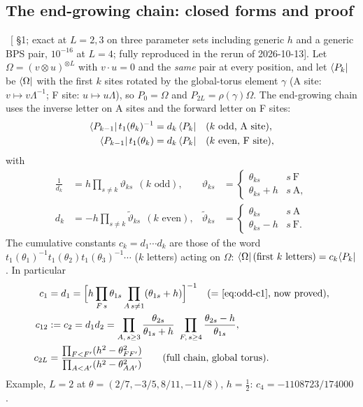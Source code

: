 \subsection{The end-growing chain: closed forms and proof}\label{sec:odd-chain}

\ex\ [ \S1; exact at $L=2,3$ on three parameter sets including generic $h$ and a generic BPS pair,
$10^{-16}$ at $L=4$; fully reproduced in the rerun of 2026-10-13]. Let $\Omega=(v\otimes u)^{\otimes L}$ with $v\cdot u=0$ and the
\emph{same} pair at every position, and let $\langle P_k|$ be $\langle\Omega|$ with the first $k$ sites rotated by the global-torus element
$\gamma$ (A site: $v\mapsto v\Lambda^{-1}$; F site: $u\mapsto u\Lambda$), so $P_0=\Omega$ and $P_{2L}=\rho(\gamma)\Omega$. The
end-growing chain uses the inverse letter on A sites and the forward letter on F sites:
\begin{align}
 \langle P_{k-1}|\,t_1(\theta_k)^{-1}&=d_k\,\langle P_k|&&(k\text{ odd, A site}),\label{eq:odd-dA}\\
 \langle P_{k-1}|\,t_1(\theta_k)&=d_k\,\langle P_k|&&(k\text{ even, F site}),\label{eq:odd-dF}
\end{align}
with
\begin{align}\label{eq:odd-d}
 \frac1{d_k}&=h\prod_{s\ne k}\vartheta_{ks}\ \ (k\text{ odd}),&
 \vartheta_{ks}&=\begin{cases}\theta_{ks}&s\ \mathrm F\\ \theta_{ks}+h&s\ \mathrm A,\end{cases}\\
 d_k&=-h\prod_{s\ne k}\tilde\vartheta_{ks}\ \ (k\text{ even}),&
 \tilde\vartheta_{ks}&=\begin{cases}\theta_{ks}&s\ \mathrm A\\ \theta_{ks}-h&s\ \mathrm F.\end{cases}
\end{align}
The cumulative constants $c_k=d_1\cdots d_k$ are those of the word $t_1(\theta_1)^{-1}t_1(\theta_2)t_1(\theta_3)^{-1}\cdots$
($k$ letters) acting on $\Omega$: $\langle\Omega|\,(\text{first }k\text{ letters})=c_k\langle P_k|$. In particular
\begin{align}
 c_1&=d_1=\Big[h\prod_{F\,s}\theta_{1s}\prod_{A\,s\ne1}(\theta_{1s}+h)\Big]^{-1}\quad\text{(= \eqref{eq:odd-c1}, now proved)},\\
 c_{12}&:=c_2=d_1d_2=\prod_{A,\,s\ge3}\frac{\theta_{2s}}{\theta_{1s}+h}\ \prod_{F,\,s\ge4}\frac{\theta_{2s}-h}{\theta_{1s}},\\
 c_{2L}&=\frac{\prod_{F<F'}(h^2-\theta_{FF'}^2)}{\prod_{A<A'}(h^2-\theta_{AA'}^2)}\qquad\text{(full chain, global torus).}
\end{align}
Example, $L=2$ at $\theta=(2/7,-3/5,8/11,-11/8)$, $h=\tfrac12$: $c_4=-1108723/174000$ \ex.

